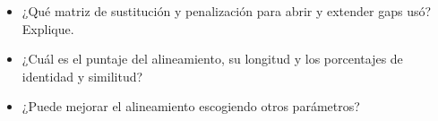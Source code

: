 \documentclass[letter,11pt]{book}
\begin{document}
{\color{red}
\begin{itemize}
\item ¿Qué matriz de sustitución y penalización para abrir y extender gaps usó? Explique.
\item ¿Cuál es el puntaje del alineamiento, su longitud y los porcentajes de identidad y similitud?
\item ¿Puede mejorar el alineamiento escogiendo otros parámetros?
\end{itemize}
}
%
%
%
%
%
%
%
%
\end{document}

